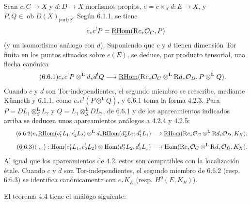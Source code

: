Sean $c:C\to X$ y $d:D\to X$ morfismos propios, $e=c\times_Xd:E\to X$, y $P,Q\in\operatorname{ob}D(X)_{\mathrm{parf}/S}$. Según 6.1.1, se tiene
\[
c_*c^!P=\underline{\mathrm{RHom}}(\mathrm{R} c_*\mathcal{O}_C,P)
\]
(y un isomorfismo análogo con $d$). Suponiendo que $c$ y $d$ tienen dimensión Tor finita en los puntos situados sobre $e(E)$, se deduce, por producto tensorial, una flecha canónica
\begin{equation}
\tag{6.6.1}
c_*c^!P\otimes^{\mathbf L}d_*d^!Q\longrightarrow
\underline{\mathrm{RHom}}(\mathrm{R} c_*\mathcal{O}_C\otimes^{\mathbf L}\mathrm{R} d_*\mathcal{O}_D,P\otimes^{\mathbf L}Q).
\end{equation}
Cuando $c$ y $d$ son Tor-independientes, el segundo miembro se reescribe, mediante Künneth y 6.1.1, como $e_*e^!(P\otimes^{\mathbf L}Q)$, y 6.6.1 toma la forma 4.2.3. Para $P=DL_1\otimes_S^{\mathbf L}L_2$ y $Q=L_1\otimes_S^{\mathbf L}DL_2$, de 6.6.1 y de los apareamientos indicados arriba se deducen unos apareamientos análogos a 4.2.4 y 4.2.5:
\begin{equation}
\tag{6.6.2}
c_*\underline{\mathrm{RHom}}(c_1^*L_1,c_2^!L_2)\otimes^{\mathbf L}d_*\underline{\mathrm{RHom}}(d_2^*L_2,d_1^!L_1)
\longrightarrow\underline{\mathrm{RHom}}(\mathrm{R} c_*\mathcal{O}_C\otimes^{\mathbf L}\mathrm{R} d_*\mathcal{O}_D,K_X),
\end{equation}
\begin{equation}
\tag{6.6.3}
\langle\ ,\ \rangle:\Hom(c_1^*L_1,c_2^!L_2)\otimes\Hom(d_2^*L_2,d_1^!L_1)
\longrightarrow\Hom(\R c_*\cO_C\otimes^{\mathbf L}\R d_*\cO_D,K_X).
\end{equation}
Al igual que los apareamientos de 4.2, estos son compatibles con la localización étale. Cuando $c$ y $d$ son Tor-independientes, el segundo miembro de 6.6.2 (resp. 6.6.3) se identifica canónicamente con $e_*K_E$ (resp. $H^0(E,K_E)$).

El teorema 4.4 tiene el análogo siguiente:

